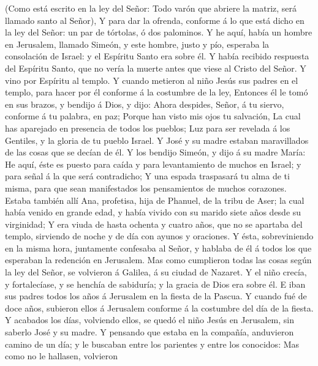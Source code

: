 (Como está escrito en la ley del Señor: Todo varón que abriere la
matriz, será llamado santo al Señor),  Y para dar la
ofrenda, conforme á lo que está dicho en la ley del Señor: un par de
tórtolas, ó dos palominos.  Y he aquí, había un hombre en
Jerusalem, llamado Simeón, y este hombre, justo y pío, esperaba la
consolación de Israel: y el Espíritu Santo era sobre él.  Y
había recibido respuesta del Espíritu Santo, que no vería la muerte
antes que viese al Cristo del Señor.  Y vino por Espíritu
al templo. Y cuando metieron al niño Jesús sus padres en el templo, para
hacer por él conforme á la costumbre de la ley,  Entonces
él le tomó en sus brazos, y bendijo á Dios, y dijo:  Ahora
despides, Señor, á tu siervo, conforme á tu palabra, en paz;
 Porque han visto mis ojos tu salvación,  La
cual has aparejado en presencia de todos los pueblos;  Luz
para ser revelada á los Gentiles, y la gloria de tu pueblo Israel.
 Y José y su madre estaban maravillados de las cosas que se
decían de él.  Y los bendijo Simeón, y dijo á su madre
María: He aquí, éste es puesto para caída y para levantamiento de muchos
en Israel; y para señal á la que será contradicho;  Y una
espada traspasará tu alma de ti misma, para que sean manifestados los
pensamientos de muchos corazones.  Estaba también allí Ana,
profetisa, hija de Phanuel, de la tribu de Aser; la cual había venido en
grande edad, y había vivido con su marido siete años desde su
virginidad;  Y era viuda de hasta ochenta y cuatro años,
que no se apartaba del templo, sirviendo de noche y de día con ayunos y
oraciones.  Y ésta, sobreviniendo en la misma hora,
juntamente confesaba al Señor, y hablaba de él á todos los que esperaban
la redención en Jerusalem.  Mas como cumplieron todas las
cosas según la ley del Señor, se volvieron á Galilea, á su ciudad de
Nazaret.  Y el niño crecía, y fortalecíase, y se henchía de
sabiduría; y la gracia de Dios era sobre él.  E iban sus
padres todos los años á Jerusalem en la fiesta de la Pascua.
 Y cuando fué de doce años, subieron ellos á Jerusalem
conforme á la costumbre del día de la fiesta.  Y acabados
los días, volviendo ellos, se quedó el niño Jesús en Jerusalem, sin
saberlo José y su madre.  Y pensando que estaba en la
compañía, anduvieron camino de un día; y le buscaban entre los parientes
y entre los conocidos:  Mas como no le hallasen, volvieron
